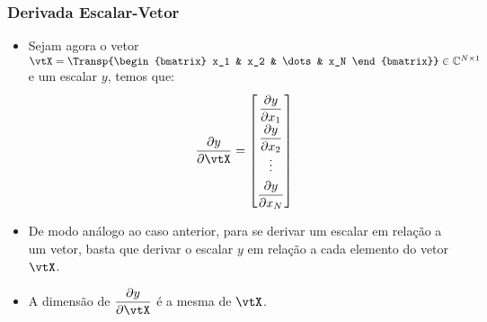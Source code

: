 \begin{frame}
	\frametitle{\normalsize Derivada Escalar-Vetor}
	\begin{itemize}
		\item Sejam agora o vetor $\vtX = \Transp{\begin{bmatrix} x_1 & x_2 & \dots & x_N \end{bmatrix}} \in \mathbb{C}^{N \times 1}$ e um escalar $y$, temos que:
		\[\renewcommand{\arraystretch}{1.8}
			\dfrac{\partial y}{\partial \vtX} = \begin{bmatrix} 
				\dfrac{\partial y}{\partial x_1} \\
				\dfrac{\partial y}{\partial x_2} \\ 
				\vdots \\ 
				\dfrac{\partial y}{\partial x_N} 
			\end{bmatrix}
		\]
		\item De modo análogo ao caso anterior, para se derivar um escalar em relação a um vetor, basta que derivar o escalar $y$ em relação a cada elemento do vetor $\vtX$.
		\item A dimensão de $\dfrac{\partial y}{\partial \vtX}$ é a mesma de $\vtX$.
	\end{itemize}
\end{frame}

